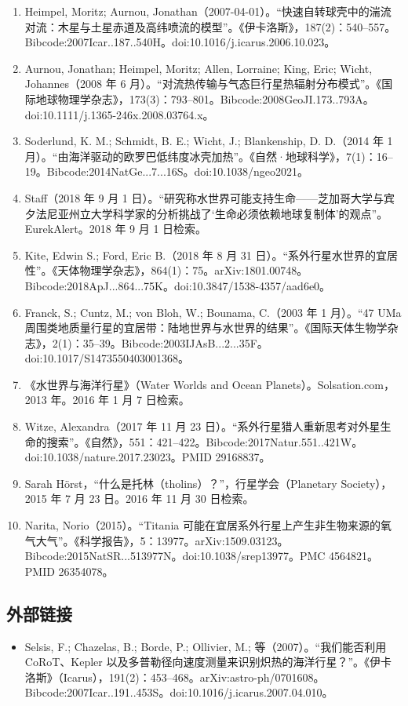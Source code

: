 \begin{enumerate}
\item Heimpel, Moritz; Aurnou, Jonathan（2007-04-01）。“快速自转球壳中的湍流对流：木星与土星赤道及高纬喷流的模型”。《伊卡洛斯》，187(2)：540–557。Bibcode:2007Icar..187..540H。doi:10.1016/j.icarus.2006.10.023。
\item Aurnou, Jonathan; Heimpel, Moritz; Allen, Lorraine; King, Eric; Wicht, Johannes（2008 年 6 月）。“对流热传输与气态巨行星热辐射分布模式”。《国际地球物理学杂志》，173(3)：793–801。Bibcode:2008GeoJI.173..793A。doi:10.1111/j.1365-246x.2008.03764.x。
\item Soderlund, K. M.; Schmidt, B. E.; Wicht, J.; Blankenship, D. D.（2014 年 1 月）。“由海洋驱动的欧罗巴低纬度冰壳加热”。《自然·地球科学》，7(1)：16–19。Bibcode:2014NatGe...7...16S。doi:10.1038/ngeo2021。
\item Staff（2018 年 9 月 1 日）。“研究称水世界可能支持生命——芝加哥大学与宾夕法尼亚州立大学科学家的分析挑战了‘生命必须依赖地球复制体’的观点”。EurekAlert。2018 年 9 月 1 日检索。
\item Kite, Edwin S.; Ford, Eric B.（2018 年 8 月 31 日）。“系外行星水世界的宜居性”。《天体物理学杂志》，864(1)：75。arXiv:1801.00748。Bibcode:2018ApJ...864...75K。doi:10.3847/1538-4357/aad6e0。
\item Franck, S.; Cuntz, M.; von Bloh, W.; Bounama, C.（2003 年 1 月）。“47 UMa 周围类地质量行星的宜居带：陆地世界与水世界的结果”。《国际天体生物学杂志》，2(1)：35–39。Bibcode:2003IJAsB...2...35F。doi:10.1017/S1473550403001368。
\item 《水世界与海洋行星》（Water Worlds and Ocean Planets）。Solsation.com，2013 年。2016 年 1 月 7 日检索。
\item Witze, Alexandra（2017 年 11 月 23 日）。“系外行星猎人重新思考对外星生命的搜索”。《自然》，551：421–422。Bibcode:2017Natur.551..421W。doi:10.1038/nature.2017.23023。PMID 29168837。
\item Sarah Hörst，“什么是托林（tholins）？”，行星学会（Planetary Society），2015 年 7 月 23 日。2016 年 11 月 30 日检索。
\item Narita, Norio（2015）。“Titania 可能在宜居系外行星上产生非生物来源的氧气大气”。《科学报告》，5：13977。arXiv:1509.03123。Bibcode:2015NatSR...513977N。doi:10.1038/srep13977。PMC 4564821。PMID 26354078。
\end{enumerate}
\subsection{外部链接}
\begin{itemize}
\item Selsis, F.; Chazelas, B.; Borde, P.; Ollivier, M.; 等（2007）。“我们能否利用 CoRoT、Kepler 以及多普勒径向速度测量来识别炽热的海洋行星？”。《伊卡洛斯》（Icarus），191(2)：453–468。arXiv:astro-ph/0701608。Bibcode:2007Icar..191..453S。doi:10.1016/j.icarus.2007.04.010。
\end{itemize}